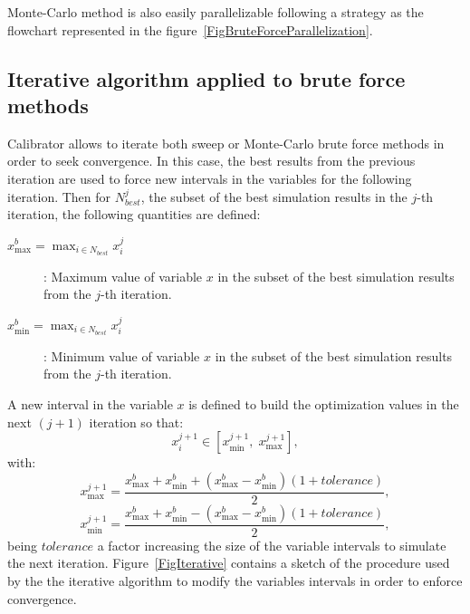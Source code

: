 \documentclass[review,authoryear]{elsarticle}
\newcommand{\EQ}[2]
{\begin{equation}#1\label{#2}\end{equation}}
\begin{document}
Monte-Carlo method is also easily parallelizable following a strategy as the
flowchart represented in the figure~\ref{FigBruteForceParallelization}.

\subsection{Iterative algorithm applied to brute force methods}

Calibrator allows to iterate both sweep or Monte-Carlo brute force methods in
order to seek convergence. In this case, the best results from the previous
iteration are used to force new intervals in the variables for the following
iteration. Then for $N_{best}^j$, the subset of the best simulation results in
the $j$-th iteration, the following quantities are defined:
\begin{description}
\item[$\displaystyle x_{\max}^b=\max_{i\in N_{best}}x_i^j$]: Maximum value of
	variable $x$ in the subset of the best simulation results from the $j$-th
	iteration.
\item[$\displaystyle x_{\min}^b=\max_{i\in N_{best}}x_i^j$]: Minimum value of
	variable $x$ in the subset of the best simulation results from the $j$-th
	iteration.
\end{description}
A new interval in the variable $x$ is defined to build the optimization values in the next $(j+1)$ iteration so that:
\EQ{x_i^{j+1}\in\left[x_{\min}^{j+1},\;x_{\max}^{j+1}\right],}
{EqIterationInterval}
with:
\[
	x_{\max}^{j+1}=\frac{x_{\max}^b+x_{\min}^b
		+\left(x_{\max}^b-x_{\min}^b\right)(1+tolerance)}{2},
\]
\[
	x_{\min}^{j+1}=\frac{x_{\max}^b+x_{\min}^b
		-\left(x_{\max}^b-x_{\min}^b\right)(1+tolerance)}{2},
\]
being $tolerance$ a factor increasing the size of the variable intervals to
simulate the next iteration.
Figure~\ref{FigIterative} contains a sketch of the procedure used by the the iterative algorithm to modify the variables intervals in order to enforce convergence. 
\end{document}
